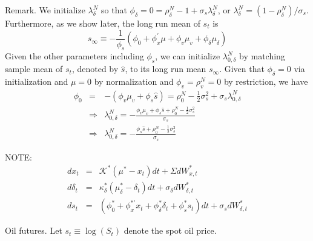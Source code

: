 \documentclass{article}
\begin{document}
Remark. We initialize $\lambda _{\delta }^{N}$ so that $\phi _{\delta
}=0=\rho _{\delta }^{N}-1+\sigma _{s}\lambda _{\delta }^{N}$, or $\lambda
_{\delta }^{N}=\left( 1-\rho _{\delta }^{N}\right) /\sigma _{s}$.
Furthermore, as we show later, the long run mean of $s_{t}$ is%
\begin{equation*}
s_{\infty }\equiv -\frac{1}{\phi _{s}}\left( \phi _{0}+\phi _{x}^{\prime
}\mu +\phi _{v}\mu _{v}+\phi _{\delta }\mu _{\delta }\right)
\end{equation*}%
Given the other parameters including $\phi _{s}$, we can initialize $\lambda
_{0,\delta }^{N}$ by matching sample mean of $s_{t}$, denoted by $\widehat{s}
$, to its long run mean $s_{\infty }$. Given that $\phi _{\delta }=0$ via
initialization and $\mu =0$ by normalization and $\phi _{v}=\rho _{v}^{N}=0$
by restriction, we have%
\begin{eqnarray*}
\phi _{0} &=&-\left( \phi _{v}\mu _{v}+\phi _{s}\widehat{s}\right) =\rho
_{0}^{N}-\frac{1}{2}\sigma _{s}^{2}+\sigma _{s}\lambda _{0,\delta }^{N} \\
&\Rightarrow &\lambda _{0,\delta }^{N}=-\frac{\phi _{v}\mu _{v}+\phi _{s}%
\widehat{s}+\rho _{0}^{N}-\frac{1}{2}\sigma _{s}^{2}}{\sigma _{s}} \\
&\Rightarrow &\lambda _{0,\delta }^{N}=-\frac{\phi _{s}\widehat{s}+\rho
_{0}^{N}-\frac{1}{2}\sigma _{s}^{2}}{\sigma _{s}}
\end{eqnarray*}

NOTE:\ 
\begin{eqnarray}
dx_{t} &=&\mathcal{K}^{\ast }\left( \mu ^{\ast }-x_{t}\right) dt+\Sigma
dW_{x,t}^{\ast } \\
d\delta _{t} &=&\kappa _{\delta }^{\ast }\left( \mu _{\delta }^{\ast
}-\delta _{t}\right) dt+\sigma _{\delta }dW_{\delta ,t}^{\ast } \\
ds_{t} &=&\left( \phi _{0}^{\ast }+\phi _{x}^{\ast \prime }x_{t}+\phi
_{\delta }^{\ast }\delta _{t}+\phi _{s}^{\ast }s_{t}\right) dt+\sigma
_{s}dW_{\delta ,t}^{\ast }
\end{eqnarray}

Oil futures. Let $s_{t}\equiv \log \left( S_{t}\right) $ denote the spot oil
price.
\end{document}
